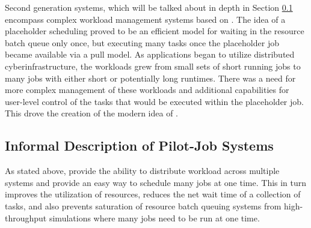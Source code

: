 \documentclass{sig-alternate}
\begin{document}
Second generation systems, which will be talked about in depth in Section \ref{sec:pj} encompass complex workload management systems based on \pilots. The idea of a placeholder scheduling proved to be an efficient model for waiting in the resource batch queue only once, but executing many tasks once the placeholder job became available via a pull model. As applications began to utilize distributed cyberinfrastructure, the workloads grew from small sets of short running jobs to many jobs with either short or potentially long runtimes. There was a need for more complex management of these workloads and additional capabilities for user-level control of the tasks that would be executed within the placeholder job. This drove the creation of the modern idea of \pilots. 
 



\subsection{Informal Description of Pilot-Job Systems}
\label{sec:pj}


As stated above, \pilotjobs provide the ability to 
distribute workload across multiple systems and
provide an easy way to schedule many jobs at one time. This in turn
improves the utilization of resources, reduces the net wait time of a
collection of tasks, and also prevents saturation of resource batch
queuing systems from high-throughput simulations where many jobs
need to be run at one time.
\end{document}
